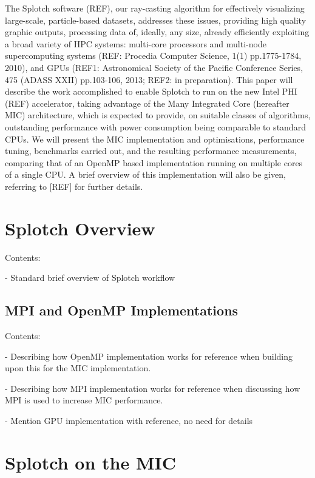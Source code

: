 \documentclass{easychair}
\begin{document}
The Splotch software (REF), our ray-casting algorithm for
effectively visualizing large-scale, particle-based datasets, addresses these issues, 
providing high quality graphic outputs, processing data of, ideally, any size, already
efficiently exploiting a broad variety of HPC systems: multi-core processors and multi-node supercomputing systems (REF: Procedia Computer Science, 1(1) pp.1775-1784, 2010), and GPUs (REF1: Astronomical Society of the Pacific Conference Series, 475 (ADASS XXII) pp.103-106, 2013; REF2: in preparation). 
This paper will describe the work accomplished to enable Splotch to 
run on the new Intel PHI (REF) accelerator, taking advantage of the Many Integrated Core (hereafter MIC) architecture,
which is expected to provide, on suitable classes of algorithms, outstanding performance 
with power consumption being comparable to standard CPUs. 
We will present the MIC implementation and optimisations, performance tuning,
benchmarks carried out, and the resulting performance measurements, comparing that of an OpenMP
based implementation running on multiple cores of a single CPU. 
A brief overview of this implementation will also be given, referring to [REF] for further details.

\section{Splotch Overview}
\label{sect:overview}

\noindent
Contents:

\noindent
- Standard brief overview of Splotch workflow 


\subsection{MPI and
 OpenMP Implementations}
\label{sect:mpiopenmp}

\noindent
Contents:

\noindent
- Describing how OpenMP implementation works for reference when building upon this for the MIC implementation.

\noindent
- Describing how MPI implementation works for reference when discussing how MPI is used to increase MIC performance.

\noindent
- Mention GPU implementation with reference, no need for details

\section{Splotch on the MIC}
\label{sect:micsplotch}
\end{document}
